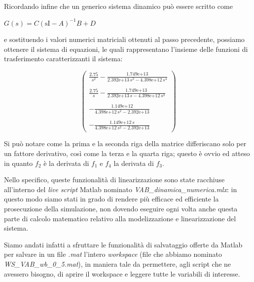Ricordando infine che un generico sistema dinamico può essere scritto come

\begin{center}
	$
	G\left(s\right)=C {\left(\mathrm{sI}-A\right)}^{-1} B+D
	$
\end{center}
e sostituendo i valori numerici matriciali ottenuti al passo precedente, possiamo ottenere il sistema di equazioni, le quali rappresentano l'insieme delle funzioni di trasferimento caratterizzanti il sistema:

\begin{center}
		$$
		\left(\begin{array}{c}
		\frac{2.75}{s^2 }-\frac{\text{1.749e+13}}{\text{2.392e+13}\,s^2 -\text{4.398e+12}\,s^4 }\\ \\
		\frac{2.75}{s}-\frac{\text{1.749e+13}}{\text{2.392e+13}\,s-\text{4.398e+12}\,s^3 }\\ \\
		-\frac{\text{1.149e+12}}{\text{4.398e+12}\,s^2 -\text{2.392e+13}}\\ \\
		-\frac{\text{1.149e+12}\,s}{\text{4.398e+12}\,s^2 -\text{2.392e+13}}
		\end{array}\right)
		$$
\end{center}
Si può notare come la prima e la seconda riga della matrice differiscano solo per un fattore derivativo, così come la terza e la quarta riga; questo è ovvio ed atteso in quanto $f_2$ è la derivata di $f_1$ e $f_4$ la derivata di $f_3$.

Nello specifico, queste funzionalità di linearizzazione sono state racchiuse all'interno del \textit{live script} Matlab nominato \textit{VAB\_dinamica\_numerica.mlx}: in questo modo siamo stati in grado di rendere più efficace ed efficiente la prosecuzione della simulazione, non dovendo eseguire ogni volta anche questa parte di calcolo matematico relativo alla modelizzazione e linearizzazione del sistema.

Siamo andati infatti a sfruttare le funzionalità di salvataggio offerte da Matlab per salvare in un file \textit{.mat} l'intero \textit{workspace} (file che abbiamo nominato \textit{WS\_VAB\_wb\_0\_5.mat}), in maniera tale da permettere, agli script che ne avessero bisogno, di aprire il workspace e leggere tutte le variabili di interesse.
